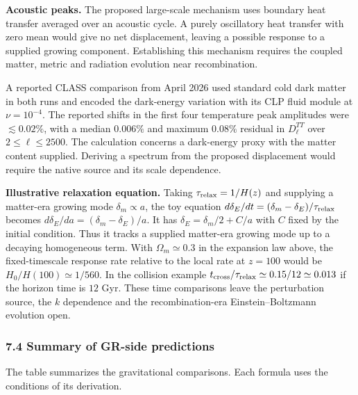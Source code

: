 \documentclass[
]{article}
\begin{document}
\textbf{Acoustic peaks.} The proposed large-scale mechanism uses
boundary heat transfer averaged over an acoustic cycle. A purely
oscillatory heat transfer with zero mean would give no net displacement,
leaving a possible response to a supplied growing component.
Establishing this mechanism requires the coupled matter, metric and
radiation evolution near recombination.

A reported CLASS comparison from April 2026 used standard cold dark
matter in both runs and encoded the dark-energy variation with its CLP
fluid module at \(\nu=10^{-4}\). The reported shifts in the first four
temperature peak amplitudes were \(\lesssim0.02\%\), with a median
\(0.006\%\) and maximum \(0.08\%\) residual in \(D_\ell^{TT}\) over
\(2\leq\ell\leq2500\). The calculation concerns a dark-energy proxy with
the matter content supplied. Deriving a spectrum from the proposed
displacement would require the native source and its scale dependence.

\textbf{Illustrative relaxation equation.} Taking
\(\tau_{\rm relax}=1/H(z)\) and supplying a matter-era growing mode
\(\delta_m\propto a\), the toy equation
\(d\delta_E/dt=(\delta_m-\delta_E)/\tau_{\rm relax}\) becomes
\(d\delta_E/da=(\delta_m-\delta_E)/a\). It has
\(\delta_E=\delta_m/2+C/a\) with \(C\) fixed by the initial condition.
Thus it tracks a supplied matter-era growing mode up to a decaying
homogeneous term. With \(\Omega_m\simeq0.3\) in the expansion law above,
the fixed-timescale response rate relative to the local rate at
\(z=100\) would be \(H_0/H(100)\simeq1/560\). In the collision example
\(t_{\rm cross}/\tau_{\rm relax}\simeq0.15/12\simeq0.013\) if the
horizon time is \(12\) Gyr. These time comparisons leave the
perturbation source, the \(k\) dependence and the recombination-era
Einstein--Boltzmann evolution open.

\hypertarget{summary-of-gr-side-predictions}{%
\subsubsection{7.4 Summary of GR-side
predictions}\label{summary-of-gr-side-predictions}}

The table summarizes the gravitational comparisons. Each formula uses
the conditions of its derivation.
\end{document}
